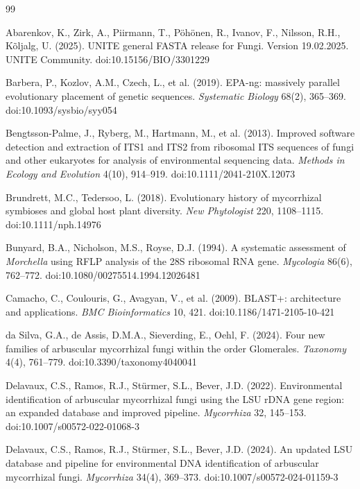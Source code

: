 \documentclass[11pt]{article}
\begin{document}
\clearpage
\begin{thebibliography}{99}

Abarenkov, K., Zirk, A., Piirmann, T., P\"oh\"onen, R., Ivanov, F., Nilsson,
R.H., K\~oljalg, U. (2025). UNITE general FASTA release for Fungi. Version
19.02.2025. UNITE Community. doi:10.15156/BIO/3301229

Barbera, P., Kozlov, A.M., Czech, L., et al. (2019). EPA-ng: massively parallel
evolutionary placement of genetic sequences. \emph{Systematic Biology} 68(2),
365--369. doi:10.1093/sysbio/syy054

Bengtsson-Palme, J., Ryberg, M., Hartmann, M., et al. (2013). Improved software
detection and extraction of ITS1 and ITS2 from ribosomal ITS sequences of fungi
and other eukaryotes for analysis of environmental sequencing data.
\emph{Methods in Ecology and Evolution} 4(10), 914--919.
doi:10.1111/2041-210X.12073

Brundrett, M.C., Tedersoo, L. (2018). Evolutionary history of mycorrhizal symbioses and global host plant
diversity. \emph{New Phytologist} 220, 1108--1115. doi:10.1111/nph.14976

Bunyard, B.A., Nicholson, M.S., Royse, D.J. (1994). A systematic assessment of \emph{Morchella} using RFLP
analysis of the 28S ribosomal RNA gene. \emph{Mycologia} 86(6), 762--772. doi:10.1080/00275514.1994.12026481

Camacho, C., Coulouris, G., Avagyan, V., et al. (2009). BLAST+: architecture and
applications. \emph{BMC Bioinformatics} 10, 421. doi:10.1186/1471-2105-10-421

da Silva, G.A., de Assis, D.M.A., Sieverding, E., Oehl, F. (2024). Four new families of
arbuscular mycorrhizal fungi within the order Glomerales. \emph{Taxonomy} 4(4), 761--779.
doi:10.3390/taxonomy4040041

Delavaux, C.S., Ramos, R.J., St\"urmer, S.L., Bever, J.D. (2022). Environmental
identification of arbuscular mycorrhizal fungi using the LSU rDNA gene region: an expanded
database and improved pipeline. \emph{Mycorrhiza} 32, 145--153.
doi:10.1007/s00572-022-01068-3

Delavaux, C.S., Ramos, R.J., St\"urmer, S.L., Bever, J.D. (2024). An updated LSU database
and pipeline for environmental DNA identification of arbuscular mycorrhizal fungi.
\emph{Mycorrhiza} 34(4), 369--373. doi:10.1007/s00572-024-01159-3


\end{thebibliography}
\end{document}

